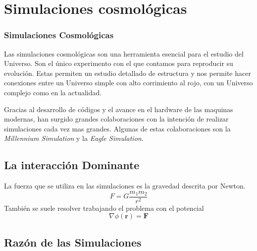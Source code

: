 \documentclass{beamer}
\begin{document}
\section{Simulaciones cosmológicas}
	\begin{frame}
		\frametitle{Simulaciones Cosmológicas}
		Las simulaciones cosmológicas son una herramienta esencial para el estudio del Universo. Son el único experimento con el que contamos para reproducir su evolución. Estas permiten un estudio detallado de estructura y nos permite hacer conexiones entre un Universo simple con alto corrimiento al rojo, con un Universo complejo como en la actualidad.
		
		Gracias al desarrollo de códigos y el avance en el hardware de las maquinas modernas, han surgido grandes colaboraciones con la intención de realizar simulaciones cada vez mas grandes. Algunas de estas colaboraciones son la \textit{Millennium Simulation} y la \textit{Eagle Simulation}.
	\end{frame}
\subsection[La interacción dominante en las simulaciones]{La interacción Dominante}
	\begin{frame}
		La fuerza que se utiliza en las simulaciones es la gravedad descrita por Newton.
		\begin{equation}
		    F = G \frac{m_1 m_2}{r^2}
		    \label{eq:Gravedad-Newton}
		\end{equation}
		También se suele resolver trabajando el problema con el potencial
		\begin{equation}
		    \nabla \phi(\mathbf{r}) = \mathbf{F}
		    \label{eq:potencial-gravitacional}
		\end{equation}
	\end{frame}
	

\subsection[Una razón práctica para las simulaciones]{Razón de las Simulaciones}
\end{document}
